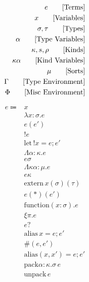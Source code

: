 \documentclass {article}
\begin{document}
\Large

\begin{align*}
e \tag* {[Terms]} \\
x \tag* {[Variables]} \\
\sigma, \tau \tag* {[Types]} \\
\alpha \tag* {[Type Variables]} \\
\kappa, s, \rho \tag* {[Kinds]} \\
\kappa \alpha \tag*{[Kind Variables]} \\
\mu \tag*{[Sorts]} \\
\Gamma \tag* {[Type Environment]} \\
\Phi \tag* {[Misc Environment]}
\end{align*}

\begin{align*}
e \Coloneqq & x \tag*{[Variable]}\\
& \lambda x : \sigma. e \tag*{[Macro Lambda]}\\
& e(e') \tag*{[Macro Application]}\\
& !e \tag*{[Bang Introduction]} \\
& \text{let} \, !x = e; e' \tag*{[Bang Elimination]} \\ 
& \Lambda \alpha : \kappa. e \tag*{[Type Lambda]} \\
& e \sigma \tag*{[Type Application]} \\
& \Lambda \kappa \alpha : \mu. e \tag*{[Kind Lambda]} \\
& e \kappa \tag*{[Kind Application]} \\
& \text{extern} \, x (\sigma) (\tau) \tag*{[Extern Symbol]} \\
& e(*)(e') \tag*{[Function Pointer Application]} \\
& \text{function} (x : \sigma). e \tag*{[Function Literal]} \\
& \xi \pi. e \tag*{[Qualified Assumption]} \\
& e? \tag*{[Qualified Check]} \\
& \text{alias} \, x = e; e' \tag*{[Runtime Let]} \\
& \#(e, e') \tag*{[Runtime Pair Introduction]} \\
& \text{alias} (x, x') = e; e' \tag*{[Runtime Pair Elimination]} \\
& \text{pack}  \alpha : \kappa. \sigma \, e \tag*{[Recursive Pack]}\\
& \text{unpack} \, e \tag*{[Recursive Unpack]} \\
\\

\end{align*}
\end{document}
